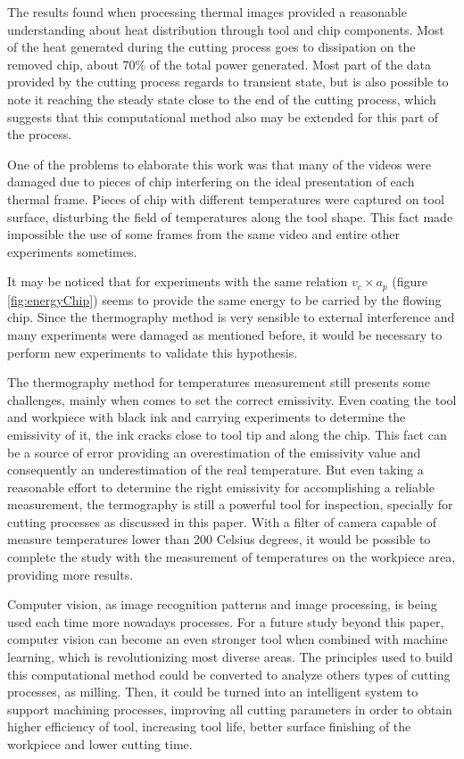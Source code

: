 The results found when processing thermal images provided a reasonable understanding about heat distribution through tool and chip components. Most of the heat generated during the cutting process goes to dissipation on the removed chip, about 70\% of the total power generated. Most part of the data provided by the cutting process regards to transient state, but is also possible to note it reaching the steady state close to the end of the cutting process, which suggests that this computational method also may be extended for this part of the process.

One of the problems to elaborate this work was that many of the videos were damaged due to pieces of chip interfering on the ideal presentation of each thermal frame. Pieces of chip with different temperatures were captured on tool surface, disturbing the field of temperatures along the tool shape. This fact made impossible the use of some frames from the same video and entire other experiments sometimes.

It may be noticed that for experiments with the same relation $v_{c}\times a_{p}$ (figure \ref{fig:energyChip}) seems to provide the same energy to be carried by the flowing chip. Since the thermography method is very sensible to external interference and many experiments were damaged as mentioned before, it would be necessary to perform new experiments to validate this hypothesis.

The thermography method for temperatures measurement still presents some challenges, mainly when comes to set the correct emissivity. Even coating the tool and workpiece with black ink and carrying experiments to determine the emissivity of it, the ink cracks close to tool tip and along the chip. This fact can be a source of error providing an overestimation of the emissivity value and consequently an underestimation of the real temperature. But even taking a reasonable effort to determine the right emissivity for accomplishing a reliable measurement, the termography is still a powerful tool for inspection, specially for cutting processes as discussed in this paper. With a filter of camera capable of measure temperatures lower than 200 Celsius degrees, it would be possible to complete the study with the measurement of temperatures on the workpiece area, providing more results.

Computer vision, as image recognition patterns and image processing, is being used each time more nowadays processes. For a future study beyond this paper, computer vision can become an even stronger tool when combined with machine learning, which is revolutionizing most diverse areas. The principles used to build this computational method could be converted to analyze others types of cutting processes, as milling. Then, it could be turned into an intelligent system to support machining processes, improving all cutting parameters in order to obtain higher efficiency of tool, increasing tool life, better surface finishing of the workpiece and lower cutting time.
